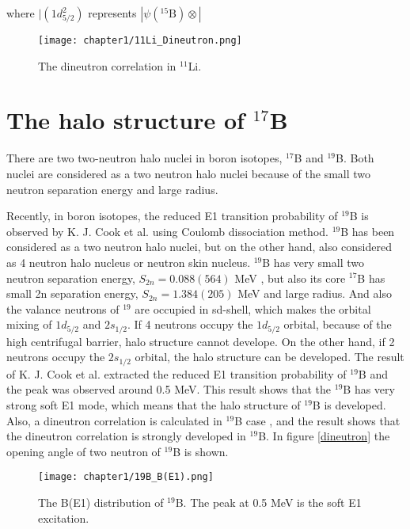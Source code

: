 where $|(1d_{5/2}^2)$ represents $|\psi({}^{15}\text{B})\otimes|$


\begin{figure}
    \centering
    \texttt{[image: chapter1/11Li\_Dineutron.png]}
    \caption{The dineutron correlation in $^{11}$Li. \cite{Hagino05}}
    \label{fig:dineutron}
\end{figure}


\section{The halo structure of ${}^{17}$B}
There are two two-neutron halo nuclei in boron isotopes, $^{17}$B and $^{19}$B. Both nuclei are considered as a two neutron halo nuclei because of the small two neutron separation energy and large radius. \cite{Suzuki99}

Recently, in boron isotopes, the reduced E1 transition probability of $^{19}$B is observed by K. J. Cook et al.\cite{KJCook} using Coulomb dissociation method. $^{19}$B has been considered as a two neutron halo nuclei, but on the other hand, also considered as 4 neutron halo nucleus or neutron skin nucleus. $^{19}$B has very small two neutron separation energy, $S_{2n} = 0.088(564)$ MeV \cite{Wang19B}, but also its core $^{17}$B has small 2n separation energy, $S_{2n} = 1.384(205)$ MeV and large radius\cite{Suzuki99}. And also the valance neutrons of $^{19}$ are occupied in sd-shell, which makes the orbital mixing of $1d_{5/2}$ and $2s_{1/2}$. If 4 neutrons occupy the $1d_{5/2}$ orbital, because of the high centrifugal barrier, halo structure cannot develope. On the other hand, if 2 neutrons occupy the $2s_{1/2}$ orbital, the halo structure can be developed. The result of K. J. Cook et al. extracted the reduced E1 transition probability of $^{19}$B and the peak was observed around 0.5 MeV. This result shows that the $^{19}$B has very strong soft E1 mode, which means that the halo structure of $^{19}$B is developed. Also, a dineutron correlation is calculated in $^{19}$B case \cite{Hagino05}, and the result shows that the dineutron correlation is strongly developed in $^{19}$B. In figure \ref{dineutron} the opening angle of two neutron of $^{19}$B is shown. 


\begin{figure}[t]
    \centering
    \texttt{[image: chapter1/19B\_B(E1).png]}
    \caption[The B(E1) distribution of $^{19}$B]{The B(E1) distribution of $^{19}$B. The peak at 0.5 MeV is the soft E1 excitation.}
\end{figure}


